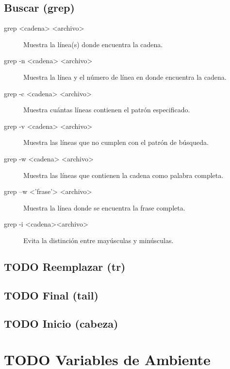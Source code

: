 \documentclass[11pt]{article}
\begin{document}
\subsection{Buscar (grep)}
\label{sec:org3f134ba}
\begin{description}
\item[{grep <cadena> <archivo>}] Muestra la línea(s) donde encuentra la cadena.

\item[{grep -n <cadena> <archivo>}] Muestra la línea y el número de línea en donde encuentra la cadena.

\item[{grep -c <cadena> <archivo>}] Muestra cuántas líneas contienen el patrón especificado.

\item[{grep -v <cadena> <archivo>}] Muestra las líneas que no cumplen con el patrón de búsqueda.

\item[{grep -w <cadena> <archivo>}] Muestra las líneas que contienen la cadena como palabra completa.

\item[{grep –w <'frase'> <archivo>}] Muestra la línea donde se encuentra la frase completa.

\item[{grep -i <cadena><archivo>}] Evita la distinción entre mayúsculas y minúsculas.
\end{description}

\subsection{{\bfseries\sffamily TODO} Reemplazar (tr)}
\label{sec:orgb11d119}
\subsection{{\bfseries\sffamily TODO} Final (tail)}
\label{sec:org326cf52}
\subsection{{\bfseries\sffamily TODO} Inicio (cabeza)}
\label{sec:org9c5bf16}


\section{{\bfseries\sffamily TODO} Variables de Ambiente}
\label{sec:orgf1f57ca}
\end{document}
